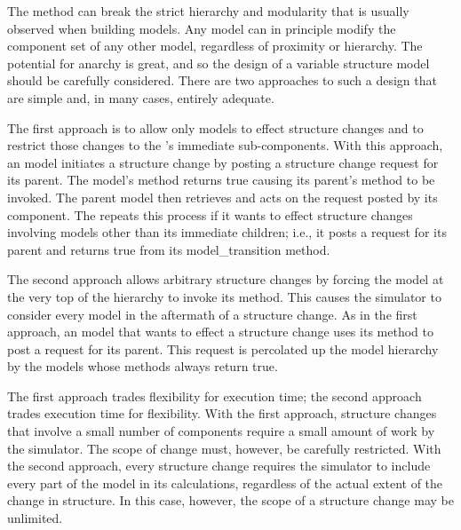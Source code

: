 The  method can break the strict hierarchy and modularity that is usually observed when building  models. Any  model can in principle modify the component set of any other model, regardless of proximity or hierarchy. The potential for anarchy is great, and so the design of a variable structure model should be carefully considered. There are two approaches to such a design that are simple and, in many cases, entirely adequate.

The first approach is to allow only  models to effect structure changes and to restrict those changes to the 's immediate sub-components. With this approach, an  model initiates a structure change by posting a structure change request for its parent. The  model's  method returns true causing its parent's  method to be invoked. The parent  model then retrieves and acts on the request posted by its component. The  repeats this process if it wants to effect structure changes involving models other than its immediate children; i.e., it posts a request for its parent and returns true from its model\_transition method.

The second approach allows arbitrary structure changes by forcing the model at the very top of the hierarchy to invoke its  method. This causes the simulator to consider every model in the aftermath of a structure change. As in the first approach, an  model that wants to effect a structure change uses its  method to post a request for its parent. This request is percolated up the model hierarchy by the  models whose  methods always return true. 

The first approach trades flexibility for execution time; the second approach trades execution time for flexibility. With the first approach, structure changes that involve a small number of components require a small amount of work by the simulator. The scope of change must, however, be carefully restricted. With the second approach, every structure change requires the simulator to include every part of the model in its calculations, regardless of the actual extent of the change in structure. In this case, however, the scope of a structure change may be unlimited.

